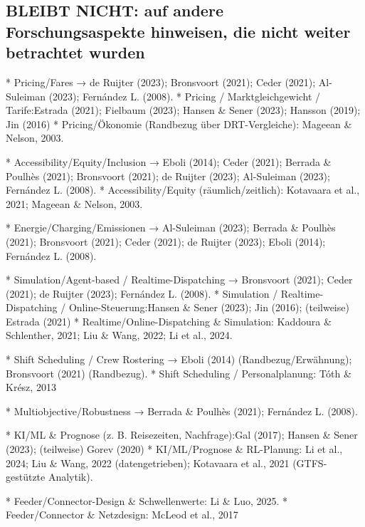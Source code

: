 \subsection{ BLEIBT NICHT: auf andere Forschungsaspekte hinweisen, die nicht weiter betrachtet wurden}
* Pricing/Fares → de Ruijter (2023); Bronsvoort (2021); Ceder (2021); Al-Suleiman (2023); Fernández L. (2008).
* Pricing / Marktgleichgewicht / Tarife:Estrada (2021); Fielbaum (2023); Hansen \& Sener (2023); Hansson (2019); Jin (2016)
* Pricing/Ökonomie (Randbezug über DRT-Vergleiche): Mageean \& Nelson, 2003.



* Accessibility/Equity/Inclusion → Eboli (2014); Ceder (2021); Berrada \& Poulhès (2021); Bronsvoort (2021); de Ruijter (2023); Al-Suleiman (2023); Fernández L. (2008).
* Accessibility/Equity (räumlich/zeitlich): Kotavaara et al., 2021; Mageean \& Nelson, 2003.




* Energie/Charging/Emissionen → Al-Suleiman (2023); Berrada \& Poulhès (2021); Bronsvoort (2021); Ceder (2021); de Ruijter (2023); Eboli (2014); Fernández L. (2008).





* Simulation/Agent-based / Realtime-Dispatching → Bronsvoort (2021); Ceder (2021); de Ruijter (2023); Fernández L. (2008).
* Simulation / Realtime-Dispatching /  Online-Steuerung:Hansen \& Sener (2023); Jin (2016); (teilweise) Estrada (2021)
* Realtime/Online-Dispatching \& Simulation: Kaddoura \& Schlenther, 2021; Liu \& Wang, 2022; Li et al., 2024.





* Shift Scheduling / Crew Rostering → Eboli (2014) (Randbezug/Erwähnung); Bronsvoort (2021) (Randbezug).
* Shift Scheduling / Personalplanung: Tóth \& Krész, 2013



* Multiobjective/Robustness → Berrada \& Poulhès (2021); Fernández L. (2008).



* KI/ML \& Prognose (z. B. Reisezeiten, Nachfrage):Gal (2017); Hansen \& Sener (2023); (teilweise) Gorev (2020)
* KI/ML/Prognose \& RL-Planung: Li et al., 2024; Liu \& Wang, 2022 (datengetrieben); Kotavaara et al., 2021 (GTFS-gestützte Analytik).




* Feeder/Connector-Design \& Schwellenwerte: Li \& Luo, 2025.
* Feeder/Connector \& Netzdesign: McLeod et al., 2017




